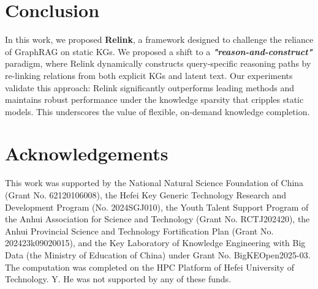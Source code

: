 \documentclass[letterpaper]{article} %
\begin{document}
\section{Conclusion}


In this work, we proposed \textbf{Relink}, a framework designed to challenge the reliance of GraphRAG on static KGs. We proposed a shift to a \textbf{\textit{"reason-and-construct"}} paradigm, where Relink dynamically constructs query-specific reasoning paths by re-linking relations from both explicit KGs and latent text. Our experiments validate this approach: Relink significantly outperforms leading methods and maintains robust performance under the knowledge sparsity that cripples static models. This underscores the value of flexible, on-demand knowledge completion.

\section*{Acknowledgements}
This work was supported by the National Natural Science Foundation of China (Grant No. 62120106008), the Hefei Key Generic Technology Research and Development Program (No. 2024SGJ010), the Youth Talent Support Program of the Anhui Association for Science and Technology (Grant No. RCTJ202420), the Anhui Provincial Science and Technology Fortification Plan (Grant No. 202423k09020015), and the Key Laboratory of Knowledge Engineering with Big Data (the Ministry of Education of China) under Grant No. BigKEOpen2025-03. The computation was completed on the HPC Platform of Hefei University of Technology. Y. He was not supported by any of these funds.



\makeatletter
\newcommand{\isChecklistMainFile}{}
\makeatother

% 

% 
\end{document}
